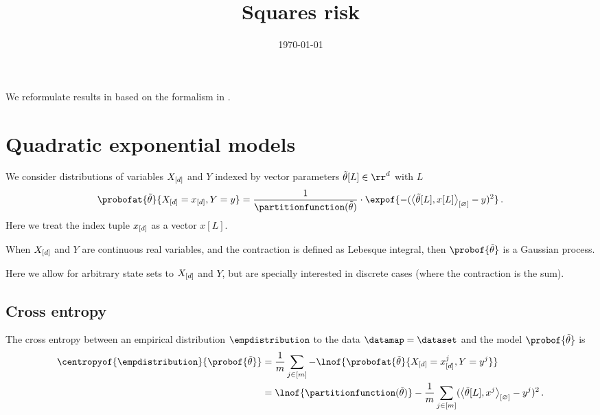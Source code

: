 \documentclass[aps,onecolumn,nofootinbib,pra]{article}
\newcommand{\slopevec}{\tilde{\theta}}
\begin{document}
    \title{Squares risk}

    \maketitle
    \date{\today}

    We reformulate results in \cite{goessmann_uniform_2021} based on the formalism in \cite{goessmann_tensor_2026}.


    \section{Quadratic exponential models}

    We consider distributions of variables $X_{[d]}$ and $Y$ indexed by vector parameters $\slopevec[L]\in\rr^\catorder$ with $L$
    \begin{align*}
        \probofat{\slopevec}{\indexedshortcatvariables,Y=y}
        =
        \frac{1}{\partitionfunction(\slopevec)} \cdot
        \expof{-(\contraction{\slopevec[L],x[L]}-y)^2} \, .
    \end{align*}
    Here we treat the index tuple $x_{[d]}$ as a vector $x[L]$.

    \begin{example}
        When $X_{[d]}$ and $Y$ are continuous real variables, and the contraction is defined as Lebesque integral, then $\probof{\slopevec}$ is a Gaussian process.


        Here we allow for arbitrary state sets to $X_{[d]}$ and $Y$, but are specially interested in discrete cases (where the contraction is the sum).
    \end{example}

    \subsection{Cross entropy}

    The cross entropy between an empirical distribution $\empdistribution$ to the data $\datamap=\dataset$ and the model $\probof{\slopevec}$ is
    \begin{align*}
        \centropyof{\empdistribution}{\probof{\slopevec}}
        &= \frac{1}{\datdim} \sum_{\datindexin}
        -\lnof{\probofat{\slopevec}{\indexedshortcatvariables^\datindex,Y=y^\datindex}} \\
        &= \lnof{\partitionfunction(\slopevec)}
        - \frac{1}{\datdim} \sum_{\datindexin}
        (\contraction{\slopevec[L],\catindex^\datindex} - y^\datindex)^2 \, .
    \end{align*}
\end{document}
